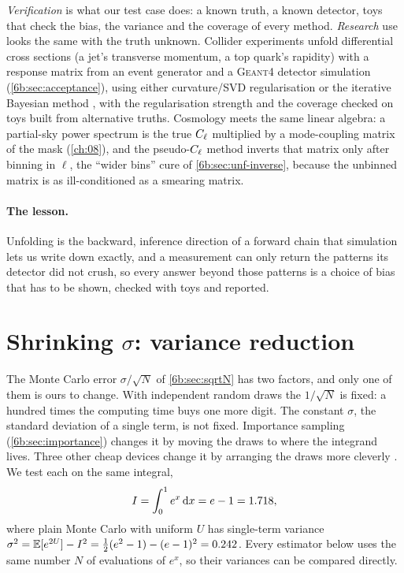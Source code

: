 \begin{inpractice}
\emph{Verification} is what our test case does: a known truth, a known detector, toys that check
the bias, the variance and the coverage of every method. \emph{Research} use looks the same with
the truth unknown. Collider experiments unfold differential cross sections (a jet's transverse
momentum, a top quark's rapidity) with a response matrix from an event generator and a
\textsc{Geant4} detector simulation (\cref{6b:sec:acceptance}), using either curvature/SVD
regularisation \cite{HoeckerKartvelishvili1996} or the iterative Bayesian method
\cite{DAgostini1995}, with the regularisation strength and the coverage checked on toys built
from alternative truths. Cosmology meets the same linear algebra: a partial-sky power spectrum is
the true $C_\ell$ multiplied by a mode-coupling matrix of the mask (\cref{ch:08}), and the
pseudo-$C_\ell$ method inverts that matrix only after binning in $\ell$, the ``wider bins'' cure of
\cref{6b:sec:unf-inverse}, because the unbinned matrix is as ill-conditioned as a smearing
matrix.
\end{inpractice}

\paragraph{The lesson.} Unfolding is the backward, inference direction of
a forward chain that simulation lets us write down exactly, and a measurement can only return the
patterns its detector did not crush, so every answer beyond those patterns is a choice of bias
that has to be shown, checked with toys and reported.
\section{Shrinking $\sigma$: variance reduction}
\label{6b:sec:varred}

The Monte Carlo error $\sigma/\sqrt N$ of \cref{6b:sec:sqrtN} has two factors, and only
one of them is ours to change. With independent random draws the $1/\sqrt N$ is fixed: a
hundred times the computing time buys one more digit. The constant $\sigma$, the standard
deviation of a single term, is not fixed. Importance sampling (\cref{6b:sec:importance}) changes it by moving the draws to where
the integrand lives. Three other cheap devices change it by arranging the draws more cleverly
. We test each on the same integral,
\[
  I=\int_0^1e^x\,\mathrm{d} x=e-1=1.718,
\]
where plain Monte Carlo with uniform $U$ has single-term variance
$\sigma^2=\E[e^{2U}]-I^2=\tfrac12(e^2-1)-(e-1)^2=\SixBVrVarPlain$. Every estimator below uses
the same number $N$ of evaluations of $e^x$, so their variances can be compared directly.

